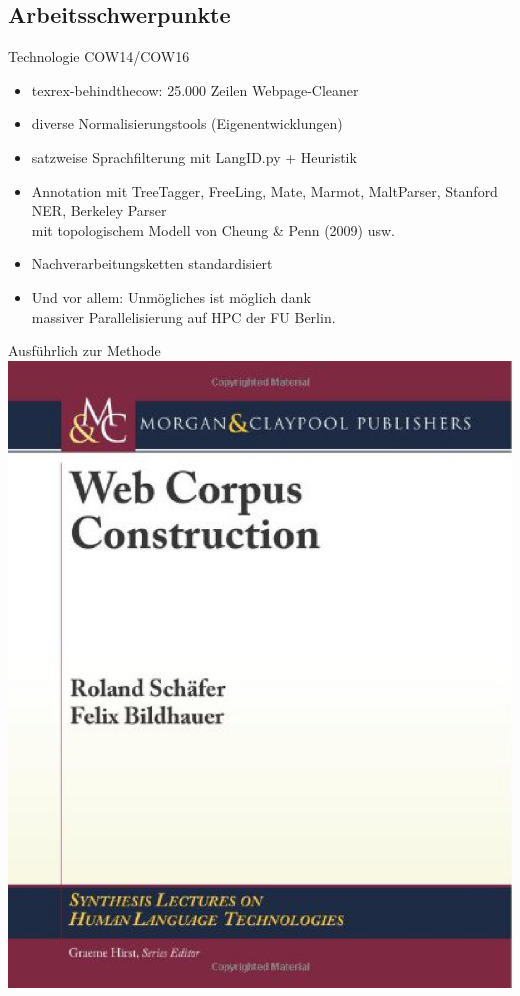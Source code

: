 \subsection{Arbeitsschwerpunkte}

\begin{frame}
	{Technologie COW14\slash COW16}

	\begin{itemize}
	  \item texrex-behindthecow: 25.000 Zeilen Webpage-Cleaner
	  \item diverse Normalisierungstools (Eigenentwicklungen)
	  \item satzweise Sprachfilterung mit LangID.py + Heuristik
	  \item Annotation mit TreeTagger, FreeLing, Mate, Marmot, MaltParser, Stanford NER, Berkeley Parser\\
	    mit topologischem Modell von Cheung \& Penn (2009) usw.
	  \item Nachverarbeitungsketten standardisiert

	  \vspace{0.5cm}
	   
	  \item Und vor allem: Unmögliches ist möglich dank\\
		massiver Parallelisierung auf HPC der FU Berlin.
	\end{itemize}
\end{frame}

\begin{frame}
	{Ausführlich zur Methode}
	\centering
	\includegraphics[height=0.7\textheight]{graphics/wcc}
\end{frame}

